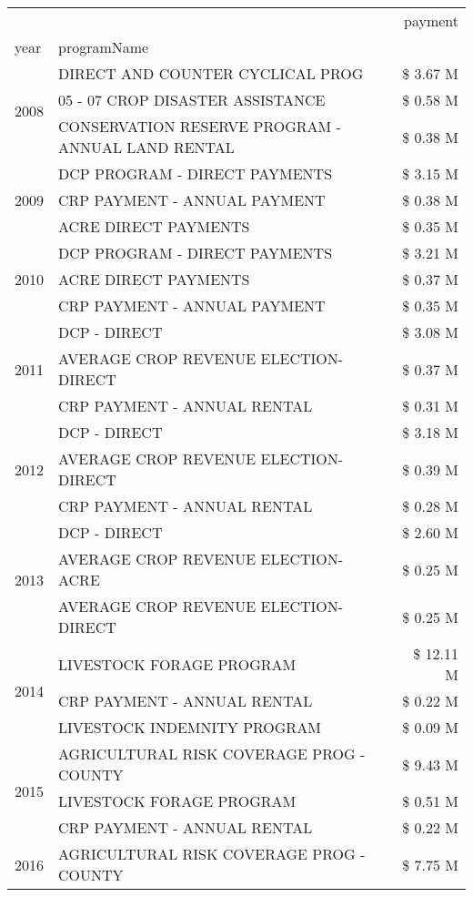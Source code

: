 \begin{tabular}{llr}
\toprule
 &  & payment \\
year & programName &  \\
\midrule
\multirow[t]{3}{*}{2008} & DIRECT AND COUNTER CYCLICAL PROG & \$ 3.67 M \\
 & 05 - 07 CROP DISASTER ASSISTANCE & \$ 0.58 M \\
 & CONSERVATION RESERVE PROGRAM - ANNUAL LAND RENTAL & \$ 0.38 M \\
\cline{1-3}
\multirow[t]{3}{*}{2009} & DCP PROGRAM - DIRECT PAYMENTS & \$ 3.15 M \\
 & CRP PAYMENT - ANNUAL PAYMENT & \$ 0.38 M \\
 & ACRE DIRECT PAYMENTS & \$ 0.35 M \\
\cline{1-3}
\multirow[t]{3}{*}{2010} & DCP PROGRAM - DIRECT PAYMENTS & \$ 3.21 M \\
 & ACRE DIRECT PAYMENTS & \$ 0.37 M \\
 & CRP PAYMENT - ANNUAL PAYMENT & \$ 0.35 M \\
\cline{1-3}
\multirow[t]{3}{*}{2011} & DCP - DIRECT & \$ 3.08 M \\
 & AVERAGE CROP REVENUE ELECTION-DIRECT & \$ 0.37 M \\
 & CRP PAYMENT - ANNUAL RENTAL & \$ 0.31 M \\
\cline{1-3}
\multirow[t]{3}{*}{2012} & DCP - DIRECT & \$ 3.18 M \\
 & AVERAGE CROP REVENUE ELECTION-DIRECT & \$ 0.39 M \\
 & CRP PAYMENT - ANNUAL RENTAL & \$ 0.28 M \\
\cline{1-3}
\multirow[t]{3}{*}{2013} & DCP - DIRECT & \$ 2.60 M \\
 & AVERAGE CROP REVENUE ELECTION-ACRE & \$ 0.25 M \\
 & AVERAGE CROP REVENUE ELECTION-DIRECT & \$ 0.25 M \\
\cline{1-3}
\multirow[t]{3}{*}{2014} & LIVESTOCK FORAGE PROGRAM & \$ 12.11 M \\
 & CRP PAYMENT - ANNUAL RENTAL & \$ 0.22 M \\
 & LIVESTOCK INDEMNITY PROGRAM & \$ 0.09 M \\
\cline{1-3}
\multirow[t]{3}{*}{2015} & AGRICULTURAL RISK COVERAGE PROG - COUNTY & \$ 9.43 M \\
 & LIVESTOCK FORAGE PROGRAM & \$ 0.51 M \\
 & CRP PAYMENT - ANNUAL RENTAL & \$ 0.22 M \\
\cline{1-3}
\multirow[t]{3}{*}{2016} & AGRICULTURAL RISK COVERAGE PROG - COUNTY & \$ 7.75 M \\

\end{tabular}
